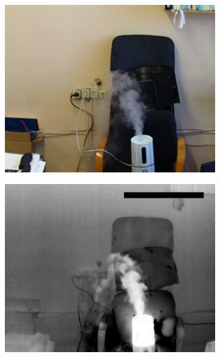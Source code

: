 \documentclass[t]{beamer}
\begin{document}
\appendix

\begin{frame}[noframenumbering]
		\begin{figure}[h!]
		\begin{subfigure}{.30\textwidth}
			\centering
			\includegraphics[width = \textwidth]{image/chapter_3/examples/img/159}
		\end{subfigure}
		\begin{subfigure}{.30\textwidth}
			\centering
			\includegraphics[width = \textwidth]{image/chapter_3/examples/tep/159}
		\end{subfigure}

\end{figure}
\end{frame}
\end{document}
